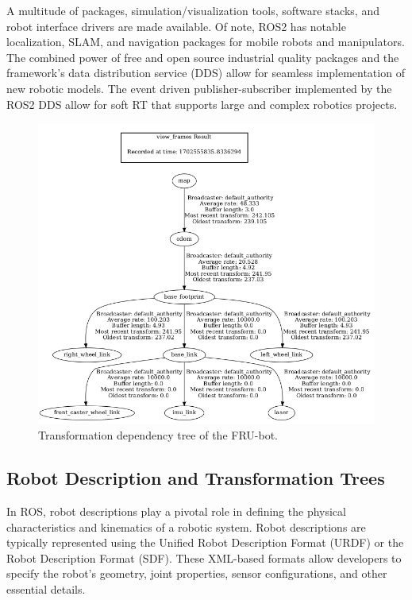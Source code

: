 \documentclass[conference]{IEEEtran}
\begin{document}
A multitude of packages, simulation/visualization tools, software stacks, and robot interface drivers are made available. Of note, ROS2 has notable localization, SLAM, and navigation packages for mobile robots and manipulators. The combined power of free and open source industrial quality packages and the framework's data distribution service (DDS) allow for seamless implementation of new robotic models. The event driven publisher-subscriber implemented by the ROS2 DDS allow for soft RT that supports large and complex robotics projects.
   
\begin{figure}
	\includegraphics[width=\linewidth]{./figs/single_robot_transformation_tree.png}
	\caption{Transformation dependency tree of the FRU-bot.}
\end{figure}
\subsection{Robot Description and Transformation Trees}

In ROS, robot descriptions play a pivotal role in defining the physical characteristics and kinematics of a robotic system. Robot descriptions are typically represented using the Unified Robot Description Format (URDF) or the Robot Description Format (SDF). These XML-based formats allow developers to specify the robot's geometry, joint properties, sensor configurations, and other essential details. 
\end{document}
